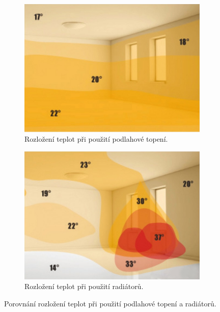 \begin{figure}[h]
     \centering
     \begin{subfigure}[b]{0.45\textwidth}
         \centering
         \includegraphics[width=\textwidth]{images/rozlozeni-teplot-podlahove-vytapeni.png}
         \caption{Rozložení teplot při použití podlahové topení.}
         \label{fig:rozlozeni-teplot-podlahove-vytapeni}
     \end{subfigure}
     \hfill
     \begin{subfigure}[b]{0.45\textwidth}
         \centering
         \includegraphics[width=\textwidth]{images/rozlozeni-teplot-radiatory.png}
         \caption{Rozložení teplot při použití radiátorů.}
         \label{fig:rozlozeni-teplot-radiatory}
     \end{subfigure}
\caption{Porovnání rozložení teplot při použití podlahové topení a radiátorů. \cite{rozlozeni-teplot-podlahove-vytapeni-a-radiatory}}
\label{fig:porovnani-rozlozeni-teplot}
\end{figure}

